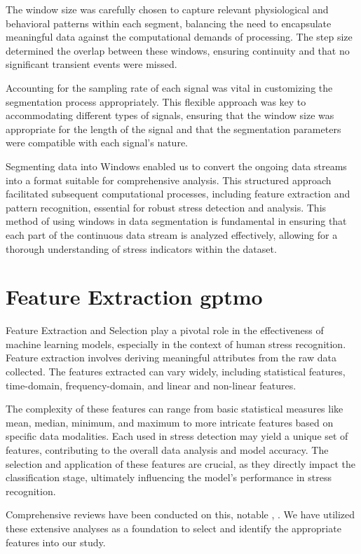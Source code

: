 The window size was carefully chosen to capture relevant physiological and behavioral patterns within each segment, balancing the need to encapsulate meaningful data against the computational demands of processing. The step size determined the overlap between these windows, ensuring continuity and that no significant transient events were missed.

Accounting for the sampling rate of each signal was vital in customizing the segmentation process appropriately. This flexible approach was key to accommodating different types of signals, ensuring that the window size was appropriate for the length of the signal and that the segmentation parameters were compatible with each signal's nature.

Segmenting data into Windows enabled us to convert the ongoing data streams into a format suitable for comprehensive analysis. This structured approach facilitated subsequent computational processes, including feature extraction and pattern recognition, essential for robust stress detection and analysis. This method of using windows in data segmentation is fundamental in ensuring that each part of the continuous data stream is analyzed effectively, allowing for a thorough understanding of stress indicators within the dataset.

\section{Feature Extraction  \gls*{gptmo}}
Feature Extraction and Selection play a pivotal role in the effectiveness of machine learning models, especially in the context of human stress recognition. Feature extraction involves deriving meaningful attributes from the raw data collected. The features extracted can vary widely, including statistical features, time-domain, frequency-domain, and linear and non-linear features.

The complexity of these features can range from basic statistical measures like mean, median, minimum, and maximum to more intricate features based on specific data modalities. Each used in stress detection may yield a unique set of features, contributing to the overall data analysis and model accuracy. The selection and application of these features are crucial, as they directly impact the classification stage, ultimately influencing the model's performance in stress recognition.

Comprehensive reviews have been conducted on this, notable \textcite{review1}, \textcite{arsalan}. We have utilized these extensive analyses as a foundation to select and identify the appropriate features into our study.


